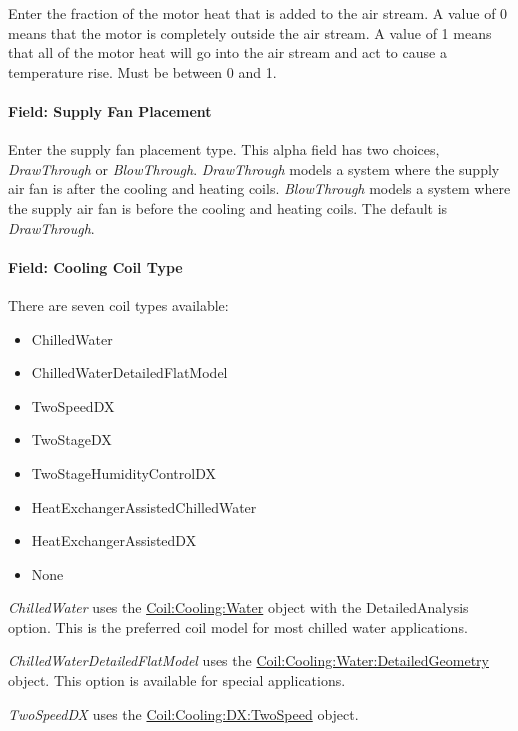 Enter the fraction of the motor heat that is added to the air stream. A value of 0 means that the motor is completely outside the air stream. A value of 1 means that all of the motor heat will go into the air stream and act to cause a temperature rise. Must be between 0 and 1.

\paragraph{Field: Supply Fan Placement}\label{field-supply-fan-placement-10}

Enter the supply fan placement type. This alpha field has two choices, \emph{DrawThrough} or \emph{BlowThrough}. \emph{DrawThrough} models a system where the supply air fan is after the cooling and heating coils. \emph{BlowThrough} models a system where the supply air fan is before the cooling and heating coils. The default is \emph{DrawThrough}.

\paragraph{Field: Cooling Coil Type}\label{field-cooling-coil-type-12}

There are seven coil types available:

\begin{itemize}
\item
  ChilledWater
\item
  ChilledWaterDetailedFlatModel
\item
  TwoSpeedDX
\item
  TwoStageDX
\item
  TwoStageHumidityControlDX
\item
  HeatExchangerAssistedChilledWater
\item
  HeatExchangerAssistedDX
\item
  None
\end{itemize}

\emph{ChilledWater} uses the \hyperref[coilcoolingwater]{Coil:Cooling:Water} object with the DetailedAnalysis option. This is the preferred coil model for most chilled water applications.

\emph{ChilledWaterDetailedFlatModel} uses the \hyperref[coilcoolingwaterdetailedgeometry]{Coil:Cooling:Water:DetailedGeometry} object. This option is available for special applications.

\emph{TwoSpeedDX} uses the \hyperref[coilcoolingdxtwospeed]{Coil:Cooling:DX:TwoSpeed} object.

